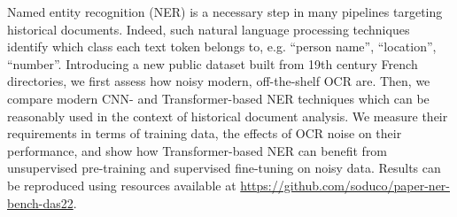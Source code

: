 Named entity recognition (NER) is a necessary step in many pipelines targeting historical documents.
Indeed, such natural language processing techniques identify which class each text token belongs to,
e.g. ``person name'', ``location'', ``number''.
Introducing a new public dataset built from 19th century French directories,
we first assess how noisy modern, off-the-shelf OCR are.
Then, we compare modern CNN- and Transformer-based NER techniques
which can be reasonably used in the context of historical document analysis.
We measure their requirements in terms of training data,
the effects of OCR noise on their performance,
and show how Transformer-based NER can benefit from unsupervised pre-training 
and supervised fine-tuning on noisy data.
Results can be reproduced using resources available at \url{https://github.com/soduco/paper-ner-bench-das22}.
